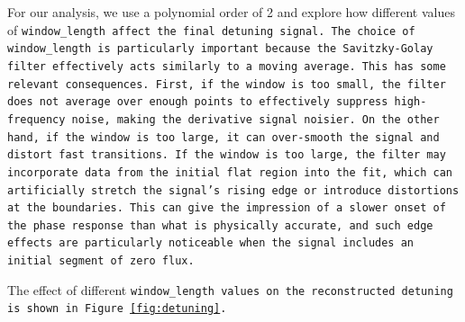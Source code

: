 For our analysis, we use a polynomial order of 2 and explore how different values of \tt{window\_length} affect the final detuning signal. 
The choice of \tt{window\_length} is particularly important because the Savitzky-Golay filter effectively acts similarly to a moving average. 
This has some relevant consequences. First, if the window is too small, the filter does not average over enough points to effectively suppress high-frequency noise, making the derivative signal noisier. 
On the other hand, if the window is too large, it can over-smooth the signal and distort fast transitions. 
If the window is too large, the filter may incorporate data from the initial flat region into the fit, which can artificially stretch the signal's rising edge or introduce distortions at the boundaries. 
This can give the impression of a slower onset of the phase response than what is physically accurate, and such edge effects are particularly noticeable when the signal includes an initial segment of zero flux.

The effect of different \tt{window\_length} values on the reconstructed detuning is shown in Figure \ref{fig:detuning}.

